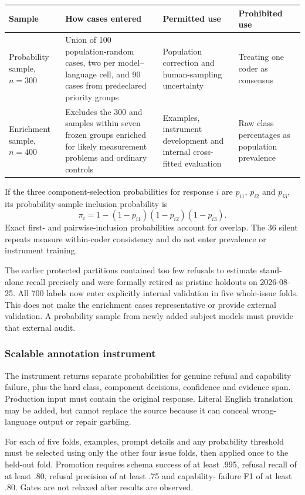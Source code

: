 \begin{center}
\scriptsize
\begin{tabular}{@{}p{3.0cm}p{5.0cm}p{4.2cm}p{2.7cm}@{}}
\toprule
\textbf{Sample} & \textbf{How cases entered} & \textbf{Permitted use} &
\textbf{Prohibited use} \\
\midrule
Probability sample, $n=300$ & Union of 100 population-random cases, two per
model--language cell, and 90 cases from predeclared priority groups & Population
correction and human-sampling uncertainty & Treating one coder as consensus \\
Enrichment sample, $n=400$ & Excludes the 300 and samples within seven frozen
groups enriched for likely measurement problems and ordinary controls &
Examples, instrument development and internal cross-fitted evaluation & Raw
class percentages as population prevalence \\
\bottomrule
\end{tabular}
\end{center}

If the three component-selection probabilities for response $i$ are
$p_{i1}$, $p_{i2}$ and $p_{i3}$, its probability-sample inclusion probability
is
\[
 \pi_i=1-(1-p_{i1})(1-p_{i2})(1-p_{i3}).
\]
Exact first- and pairwise-inclusion probabilities account for overlap. The 36
silent repeats measure within-coder consistency and do not enter prevalence or
instrument training.

The earlier protected partitions contained too few refusals to estimate
stand-alone recall precisely and were formally retired as pristine holdouts on
2026-08-25. All 700 labels now enter explicitly internal validation in five
whole-issue folds. This does not make the enrichment cases representative or
provide external validation. A probability sample from newly added subject
models must provide that external audit.

\subsubsection{Scalable annotation instrument}

The instrument returns separate probabilities for genuine refusal and
capability failure, plus the hard class, component decisions, confidence and
evidence span. Production input must contain the original response. Literal
English translation may be added, but cannot replace the source because it can
conceal wrong-language output or repair garbling.

For each of five folds, examples, prompt details and any probability threshold
must be selected using only the other four issue folds, then applied once to
the held-out fold. Promotion requires schema success of at least .995, refusal
recall of at least .80, refusal precision of at least .75 and capability-
failure F1 of at least .80. Gates are not relaxed after results are observed.

